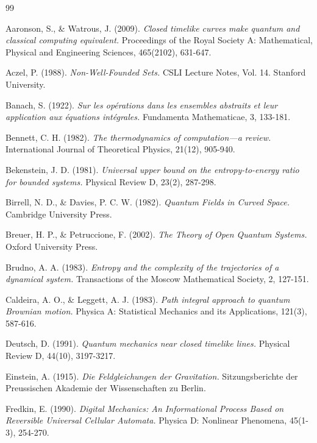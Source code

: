 \documentclass[12pt,openany]{book}
\theoremstyle{plain}
\theoremstyle{definition}
\theoremstyle{remark}
\begin{document}
\begin{thebibliography}{99}

Aaronson, S., \& Watrous, J. (2009). \textit{Closed timelike curves make quantum and classical computing equivalent.} Proceedings of the Royal Society A: Mathematical, Physical and Engineering Sciences, 465(2102), 631-647.

Aczel, P. (1988). \textit{Non-Well-Founded Sets.} CSLI Lecture Notes, Vol. 14. Stanford University.

Banach, S. (1922). \textit{Sur les op\'erations dans les ensembles abstraits et leur application aux \'equations int\'egrales.} Fundamenta Mathematicae, 3, 133-181.

Bennett, C. H. (1982). \textit{The thermodynamics of computation---a review.} International Journal of Theoretical Physics, 21(12), 905-940.

Bekenstein, J. D. (1981). \textit{Universal upper bound on the entropy-to-energy ratio for bounded systems.} Physical Review D, 23(2), 287-298.

Birrell, N. D., \& Davies, P. C. W. (1982). \textit{Quantum Fields in Curved Space.} Cambridge University Press.

Breuer, H. P., \& Petruccione, F. (2002). \textit{The Theory of Open Quantum Systems.} Oxford University Press.

Brudno, A. A. (1983). 
\textit{Entropy and the complexity of the trajectories of a dynamical system.} 
Transactions of the Moscow Mathematical Society, 2, 127-151.

Caldeira, A. O., \& Leggett, A. J. (1983). \textit{Path integral approach to quantum Brownian motion.} Physica A: Statistical Mechanics and its Applications, 121(3), 587-616.

Deutsch, D. (1991). \textit{Quantum mechanics near closed timelike lines.} Physical Review D, 44(10), 3197-3217.

Einstein, A. (1915). \textit{Die Feldgleichungen der Gravitation.} Sitzungsberichte der Preussischen Akademie der Wissenschaften zu Berlin.

Fredkin, E. (1990). \textit{Digital Mechanics: An Informational Process Based on Reversible Universal Cellular Automata.} Physica D: Nonlinear Phenomena, 45(1-3), 254-270.


\end{thebibliography}
\end{document}
